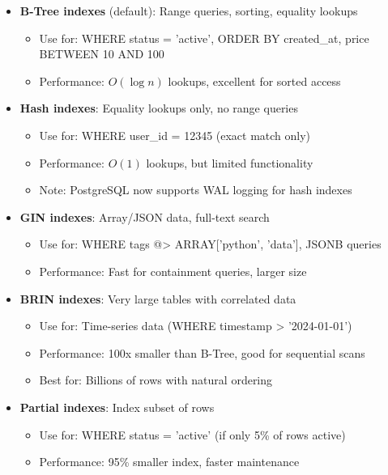 \begin{itemize}
    \item \textbf{B-Tree indexes} (default): Range queries, sorting, equality lookups
    \begin{itemize}
        \item Use for: WHERE status = 'active', ORDER BY created\_at, price BETWEEN 10 AND 100
        \item Performance: $O(\log n)$ lookups, excellent for sorted access
    \end{itemize}

    \item \textbf{Hash indexes}: Equality lookups only, no range queries
    \begin{itemize}
        \item Use for: WHERE user\_id = 12345 (exact match only)
        \item Performance: $O(1)$ lookups, but limited functionality
        \item Note: PostgreSQL now supports WAL logging for hash indexes
    \end{itemize}

    \item \textbf{GIN indexes}: Array/JSON data, full-text search
    \begin{itemize}
        \item Use for: WHERE tags @> ARRAY['python', 'data'], JSONB queries
        \item Performance: Fast for containment queries, larger size
    \end{itemize}

    \item \textbf{BRIN indexes}: Very large tables with correlated data
    \begin{itemize}
        \item Use for: Time-series data (WHERE timestamp > '2024-01-01')
        \item Performance: 100x smaller than B-Tree, good for sequential scans
        \item Best for: Billions of rows with natural ordering
    \end{itemize}

    \item \textbf{Partial indexes}: Index subset of rows
    \begin{itemize}
        \item Use for: WHERE status = 'active' (if only 5\% of rows active)
        \item Performance: 95\% smaller index, faster maintenance
    \end{itemize}


\end{itemize}
